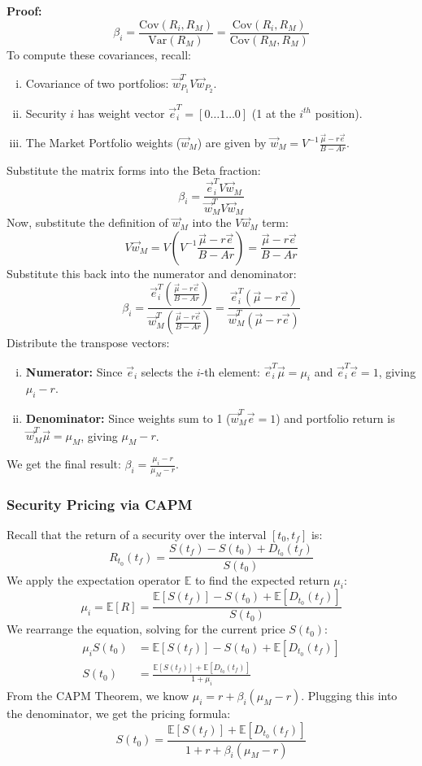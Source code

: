 \textbf{Proof: }
\[
\beta_i = \frac{\text{Cov}(R_i, R_M)}{\text{Var}(R_M)} = \frac{\text{Cov}(R_i, R_M)}{\text{Cov}(R_M, R_M)}
\]
To compute these covariances, recall:
\begin{enumerate}[i.]
    \item Covariance of two portfolios: $\vec{w}_{P_1}^T V \vec{w}_{P_2}$.
    \item Security $i$ has weight vector $\vec{e}_i^T = [0 \dots 1 \dots 0]$ (1 at the $i^{th}$ position).
    \item The Market Portfolio weights ($\vec{w}_M$) are given by \(\vec{w}_M = V^{-1} \frac{\vec{\mu} - r\vec{e}}{B - Ar}\).
\end{enumerate}
Substitute the matrix forms into the Beta fraction:
\[
\beta_i = \frac{\vec{e}_i^T V \vec{w}_M}{\vec{w}_M^T V \vec{w}_M}
\]
Now, substitute the definition of $\vec{w}_M$ into the $V \vec{w}_M$ term:
\[
V \vec{w}_M = V \left( V^{-1} \frac{\vec{\mu} - r\vec{e}}{B - Ar} \right) = \frac{\vec{\mu} - r\vec{e}}{B - Ar}
\]
Substitute this back into the numerator and denominator:
\begin{equation*}
    \beta_i = \frac{\vec{e}_i^T \left( \frac{\vec{\mu} - r\vec{e}}{B - Ar} \right)}{\vec{w}_M^T \left( \frac{\vec{\mu} - r\vec{e}}{B - Ar} \right)} = \frac{\vec{e}_i^T (\vec{\mu} - r\vec{e})}{\vec{w}_M^T (\vec{\mu} - r\vec{e})}
\end{equation*}
Distribute the transpose vectors:
\begin{enumerate}[i.]
    \item \textbf{Numerator:} Since $\vec{e}_i$ selects the $i$-th element: $\vec{e}_i^T \vec{\mu} = \mu_i$ and $\vec{e}_i^T \vec{e} = 1$, giving \(\mu_i - r\).

    \item \textbf{Denominator:} Since weights sum to 1 ($\vec{w}_M^T \vec{e} = 1$) and portfolio return is $\vec{w}_M^T \vec{\mu} = \mu_M$, giving \(\mu_M - r\).
\end{enumerate}
We get the final result: \(\beta_i = \frac{\mu_i - r}{\mu_M - r}\).

\subsubsection{Security Pricing via CAPM}
Recall that the return of a security over the interval $[t_0, t_f]$ is:
\[
R_{t_0}(t_f) = \frac{S(t_f) - S(t_0) + D_{t_0}(t_f)}{S(t_0)}
\]
We apply the expectation operator $\mathbb{E}$ to find the expected return $\mu_i$:
\[
\mu_i = \mathbb{E}[R] = \frac{\mathbb{E}[S(t_f)] - S(t_0) + \mathbb{E}[D_{t_0}(t_f)]}{S(t_0)}
\]
We rearrange the equation, solving for the current price \(S(t_0)\):
\begin{align*}
\mu_i S(t_0) &= \mathbb{E}[S(t_f)] - S(t_0) + \mathbb{E}[D_{t_0}(t_f)] \\
S(t_0) &= \frac{\mathbb{E}[S(t_f)] + \mathbb{E}[D_{t_0}(t_f)]}{1 + \mu_i}
\end{align*}
From the CAPM Theorem, we know $\mu_i = r + \beta_i(\mu_M - r)$. Plugging this into the denominator, we get the pricing formula:
\[
\boxed{S(t_0) = \frac{\mathbb{E}[S(t_f)] + \mathbb{E}[D_{t_0}(t_f)]}{1 + r + \beta_i(\mu_M - r)}}
\]

